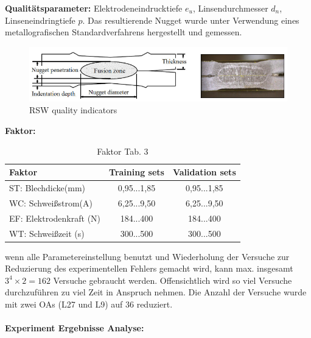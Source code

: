 \documentclass[english,ngerman]{tudscrreprt}
\begin{document}
\textbf{Qualitätsparameter: }Elektrodeneindrucktiefe $e_{u}$, Linsendurchmesser $d_{n}$, Linseneindringtiefe $p$. Das resultierende Nugget wurde unter Verwendung eines metallografischen Standardverfahrens hergestellt und gemessen.\\
\begin{figure}[H]
\centering
\includegraphics[scale = 0.8]{./Bilder/RSW quality indicators.png}
\caption{RSW quality indicators}\label{fig:RSW_QI}
\end{figure}
\noindent
\textbf{Faktor: }
\begin{table}[H]
\caption{Faktor Tab. 3}
\begin{flushleft}
	\begin{tabular}{lcc} 
		\toprule
 		\textbf{Faktor} & \textbf{Training sets} & \textbf{Validation sets}\\
		\midrule
		ST: Blechdicke(mm) & 0,95...1,85 & 0,95...1,85\\

		WC: Schweißstrom(A) & 6,25...9,50 & 6,25...9,50\\

		EF: Elektrodenkraft (N) & 184...400 & 184...400\\

		WT: Schweißzeit (s) & 300...500 & 300...500\\
		\bottomrule
	\end{tabular}
\end{flushleft}
\end{table}
wenn alle Parametereinstellung benutzt  und Wiederholung der Versuche zur Reduzierung des experimentellen Fehlers gemacht wird, kann max. insgesamt $3^4\times2 =162$ Versuche gebraucht werden. Offensichtlich wird so viel Versuche durchzuführen zu viel Zeit in Anspruch nehmen. Die Anzahl der Versuche wurde mit zwei OAs (L27 und L9) auf 36 reduziert.\\
\\
\textbf{Experiment Ergebnisse Analyse: }
\end{document}
